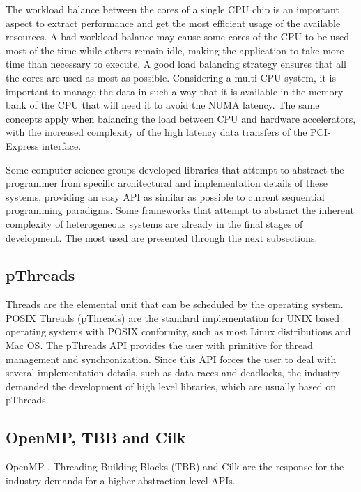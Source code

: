 The workload balance between the cores of a single CPU chip is an important aspect to extract performance and get the most efficient usage of the available resources. A bad workload balance may cause some cores of the CPU to be used most of the time while others remain idle, making the application to take more time than necessary to execute. A good load balancing strategy ensures that all the cores are used as most as possible. Considering a multi-CPU system, it is important to manage the data in such a way that it is available in the memory bank of the CPU that will need it to avoid the NUMA latency. The same concepts apply when balancing the load between CPU and hardware accelerators, with the increased complexity of the high latency data transfers of the PCI-Express interface.

Some computer science groups developed libraries that attempt to abstract the programmer from specific architectural and implementation details of these systems, providing an easy API as similar as possible to current sequential programming paradigms. Some frameworks that attempt to abstract the inherent complexity of heterogeneous systems are already in the final stages of development. The most used are presented through the next subsections.

\subsection{pThreads}
\label{pThreads}

Threads are the elemental unit that can be scheduled by the operating system. POSIX Threads (pThreads) are the standard implementation for UNIX based operating systems with POSIX conformity, such as most Linux distributions and Mac OS. The pThreads API provides the user with primitive for thread management and synchronization. Since this API forces the user to deal with several implementation details, such as data races and deadlocks, the industry demanded the development of high level libraries, which are usually based on pThreads.

\subsection{OpenMP, TBB and Cilk}
\label{OpenMP}

OpenMP \cite{OpenMP}, \intel Threading Building Blocks (TBB) \cite{Intel:TBB} and Cilk \cite{Cilk} are the response for the industry demands for a higher abstraction level APIs.

